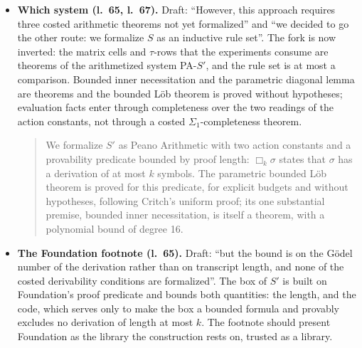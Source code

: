 \begin{itemize}
\item \textbf{Which system (l.~65, l.~67).} Draft: ``However, this approach requires three costed arithmetic theorems not yet formalized'' and ``we decided to go the other route: we formalize $S$ as an inductive rule set''. The fork is now inverted: the matrix cells and $\tau$-rows that the experiments consume are theorems of the arithmetized system PA-$S'$, and the rule set is at most a comparison. Bounded inner necessitation and the parametric diagonal lemma are theorems and the bounded L\"ob theorem is proved without hypotheses; evaluation facts enter through completeness over the two readings of the action constants, not through a costed $\Sigma_1$-completeness theorem.
\begin{quote}
We formalize $S'$ as Peano Arithmetic with two action constants and a provability predicate bounded by proof length: $\Box_k\sigma$ states that $\sigma$ has a derivation of at most $k$ symbols. The parametric bounded L\"ob theorem is proved for this predicate, for explicit budgets and without hypotheses, following Critch's uniform proof; its one substantial premise, bounded inner necessitation, is itself a theorem, with a polynomial bound of degree 16.
\end{quote}
\item \textbf{The Foundation footnote (l.~65).} Draft: ``but the bound is on the G\"odel number of the derivation rather than on transcript length, and none of the costed derivability conditions are formalized''. The box of $S'$ is built on Foundation's proof predicate and bounds both quantities: the length, and the code, which serves only to make the box a bounded formula and provably excludes no derivation of length at most $k$. The footnote should present Foundation as the library the construction rests on, trusted as a library.

\end{itemize}
